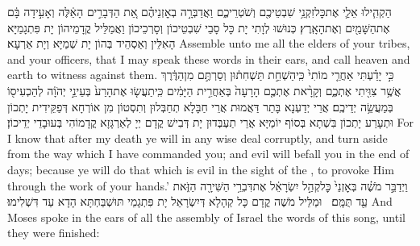{הַקְהִ֧ילוּ אֵלַ֛י אֶת\maqqaf כׇּל\maqqaf זִקְנֵ֥י שִׁבְטֵיכֶ֖ם וְשֹׁטְרֵיכֶ֑ם וַאֲדַבְּרָ֣ה בְאׇזְנֵיהֶ֗ם אֵ֚ת הַדְּבָרִ֣ים הָאֵ֔לֶּה וְאָעִ֣ידָה בָּ֔ם אֶת\maqqaf הַשָּׁמַ֖יִם וְאֶת\maqqaf הָאָֽרֶץ׃}
{כְּנוּשׁוּ לְוָתִי יָת כָּל סָבֵי שִׁבְטֵיכוֹן וְסָרְכֵיכוֹן וַאֲמַלֵּיל קֳדָמֵיהוֹן יָת פִּתְגָמַיָּא הָאִלֵּין וְאַסְהֵיד בְּהוֹן יָת שְׁמַיָּא וְיָת אַרְעָא׃}
{Assemble unto me all the elders of your tribes, and your officers, that I may speak these words in their ears, and call heaven and earth to witness against them.}{}
{כִּ֣י יָדַ֗עְתִּי אַחֲרֵ֤י מוֹתִי֙ כִּֽי\maqqaf הַשְׁחֵ֣ת תַּשְׁחִת֔וּן וְסַרְתֶּ֣ם מִן\maqqaf הַדֶּ֔רֶךְ אֲשֶׁ֥ר צִוִּ֖יתִי אֶתְכֶ֑ם וְקָרָ֨את אֶתְכֶ֤ם הָרָעָה֙ בְּאַחֲרִ֣ית הַיָּמִ֔ים כִּֽי\maqqaf תַעֲשׂ֤וּ אֶת\maqqaf הָרַע֙ בְּעֵינֵ֣י יְהֹוָ֔ה לְהַכְעִיס֖וֹ בְּמַעֲשֵׂ֥ה יְדֵיכֶֽם׃}
{אֲרֵי יְדַעְנָא בָּתַר דַּאֲמוּת אֲרֵי חַבָּלָא תְחַבְּלוּן וְתִסְטוֹן מִן אוֹרְחָא דְּפַקֵּידִית יָתְכוֹן וּתְעָרַע יָתְכוֹן בִּשְׁתָא בְּסוֹף יוֹמַיָּא אֲרֵי תַעְבְּדוּן יָת דְּבִישׁ קֳדָם יְיָ לְאַרְגָּזָא קֳדָמוֹהִי בְּעוּבָדֵי יְדֵיכוֹן׃}
{For I know that after my death ye will in any wise deal corruptly, and turn aside from the way which I have commanded you; and evil will befall you in the end of days; because ye will do that which is evil in the sight of the \lord, to provoke Him through the work of your hands.’}{}
{וַיְדַבֵּ֣ר מֹשֶׁ֗ה בְּאׇזְנֵי֙ כׇּל\maqqaf קְהַ֣ל יִשְׂרָאֵ֔ל אֶת\maqqaf דִּבְרֵ֥י הַשִּׁירָ֖ה הַזֹּ֑את עַ֖ד תֻּמָּֽם׃ \petucha }
{וּמַלֵּיל מֹשֶׁה קֳדָם כָּל קְהָלָא דְּיִשְׂרָאֵל יָת פִּתְגָמֵי תּוּשְׁבַּחְתָּא הָדָא עַד דִּשְׁלִימוּ׃}
{And Moses spoke in the ears of all the assembly of Israel the words of this song, until they were finished:}{}

